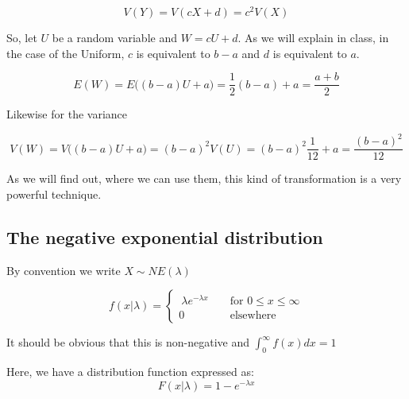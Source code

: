 \documentclass[12pt]{extbook}
\begin{document}
\begin{displaymath}
V(Y) = V(cX+d) = c^2 V(X)
\end{displaymath}


So, let $U$ be a random variable and $W=cU + d$.   As we will explain in class, in the case of the Uniform, $c$ is equivalent to $b-a$ and $d$ is equivalent to $a$.


\begin{displaymath}
E(W) = E \big( (b-a) U + a \big) =  \frac{1}{2}(b-a) + a = \frac{a+b}{2}
\end{displaymath}

Likewise for the variance

\begin{displaymath}
V(W) = V \big( (b-a) U + a \big) =  (b-a)^2 V(U) = (b-a)^2 \frac{1}{12} + a = \frac{(b-a)^2}{12}
\end{displaymath}


As we will find out, where we can use them, this kind of transformation is a very powerful technique.


\subsection{The negative exponential distribution}

{\color{green} By convention we write $X \sim NE(\lambda)$}

\begin{displaymath}
f(x|\lambda) = \left\{ \begin{array}{rrr} \  \lambda e^{-\lambda x} & & \mbox{ for } 0 \leq x \leq \infty \\ 0 & & \mbox{ elsewhere } \end{array} \right.
\end{displaymath}

It should be obvious that this is non-negative and $\int_0^{\infty}f(x)dx=1$

Here, we have a distribution function expressed as:
\begin{displaymath}
F(x|\lambda) = 1-e^{-\lambda x}
\end{displaymath}

\end{document}

